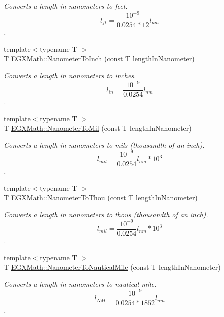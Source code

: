 \begin{DoxyCompactItemize}
\begin{DoxyCompactList}\small\item\em Converts a length in nanometers to feet. \[ l_{ft}= \frac{10^{-9}}{0.0254 * 12} l_{nm} \]. \end{DoxyCompactList}\item 
{\footnotesize template$<$typename T $>$ }\\T \mbox{\hyperlink{group___e_g_x_math-_conversions-_length_conversions-_s_i-_nanometer-_imperial_ga8b72dde5616da5be31e8054f1facc501}{E\+G\+X\+Math\+::\+Nanometer\+To\+Inch}} (const T length\+In\+Nanometer)
\begin{DoxyCompactList}\small\item\em Converts a length in nanometers to inches. \[ l_{in}= \frac{10^{-9}}{0.0254} l_{nm} \]. \end{DoxyCompactList}\item 
{\footnotesize template$<$typename T $>$ }\\T \mbox{\hyperlink{group___e_g_x_math-_conversions-_length_conversions-_s_i-_nanometer-_imperial_gacfd62a86ae9a5085569840f3b7bbdb3e}{E\+G\+X\+Math\+::\+Nanometer\+To\+Mil}} (const T length\+In\+Nanometer)
\begin{DoxyCompactList}\small\item\em Converts a length in nanometers to mils (thousandth of an inch). \[ l_{mil}= \frac{10^{-9}}{0.0254} l_{nm} * 10^{3} \]. \end{DoxyCompactList}\item 
{\footnotesize template$<$typename T $>$ }\\T \mbox{\hyperlink{group___e_g_x_math-_conversions-_length_conversions-_s_i-_nanometer-_imperial_ga4c714a8d3ab333da358dafe181ebdcc4}{E\+G\+X\+Math\+::\+Nanometer\+To\+Thou}} (const T length\+In\+Nanometer)
\begin{DoxyCompactList}\small\item\em Converts a length in nanometers to thous (thousandth of an inch). \[ l_{mil}= \frac{10^{-9}}{0.0254} l_{nm} * 10^{3} \]. \end{DoxyCompactList}\item 
{\footnotesize template$<$typename T $>$ }\\T \mbox{\hyperlink{group___e_g_x_math-_conversions-_length_conversions-_s_i-_nanometer-_nautical_gac428c495bff87ba53c856395a7410fc3}{E\+G\+X\+Math\+::\+Nanometer\+To\+Nautical\+Mile}} (const T length\+In\+Nanometer)
\begin{DoxyCompactList}\small\item\em Converts a length in nanometers to nautical mile. \[ l_{NM}= \frac{10^{-9}}{0.0254 * 1852} l_{nm} \]. \end{DoxyCompactList}\item 

\end{DoxyCompactItemize}

